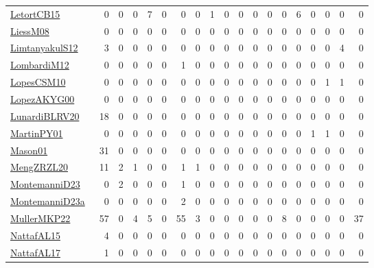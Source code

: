 {\begin{longtable}{l*{18}{r}}
\href{articles/LetortCB15.pdf}{LetortCB15}~\cite{LetortCB15} & 0 & 0 & 0 & 7 & 0 & 0 & 0 & 1 & 0 & 0 & 0 & 0 & 0 & 6 & 0 & 0 & 0 & 0\\
\href{articles/LiessM08.pdf}{LiessM08}~\cite{LiessM08} & 0 & 0 & 0 & 0 & 0 & 0 & 0 & 0 & 0 & 0 & 0 & 0 & 0 & 0 & 0 & 0 & 0 & 0\\
\href{articles/LimtanyakulS12.pdf}{LimtanyakulS12}~\cite{LimtanyakulS12} & 3 & 0 & 0 & 0 & 0 & 0 & 0 & 0 & 0 & 0 & 0 & 0 & 0 & 0 & 0 & 0 & 4 & 0\\
\href{articles/LombardiM12.pdf}{LombardiM12}~\cite{LombardiM12} & 0 & 0 & 0 & 0 & 0 & 1 & 0 & 0 & 0 & 0 & 0 & 0 & 0 & 0 & 0 & 0 & 0 & 0\\
\href{articles/LopesCSM10.pdf}{LopesCSM10}~\cite{LopesCSM10} & 0 & 0 & 0 & 0 & 0 & 0 & 0 & 0 & 0 & 0 & 0 & 0 & 0 & 0 & 0 & 1 & 1 & 0\\
\href{articles/LopezAKYG00.pdf}{LopezAKYG00}~\cite{LopezAKYG00} & 0 & 0 & 0 & 0 & 0 & 0 & 0 & 0 & 0 & 0 & 0 & 0 & 0 & 0 & 0 & 0 & 0 & 0\\
\href{articles/LunardiBLRV20.pdf}{LunardiBLRV20}~\cite{LunardiBLRV20} & 18 & 0 & 0 & 0 & 0 & 0 & 0 & 0 & 0 & 0 & 0 & 0 & 0 & 0 & 0 & 0 & 0 & 0\\
\href{articles/MartinPY01.pdf}{MartinPY01}~\cite{MartinPY01} & 0 & 0 & 0 & 0 & 0 & 0 & 0 & 0 & 0 & 0 & 0 & 0 & 0 & 0 & 1 & 1 & 0 & 0\\
\href{articles/Mason01.pdf}{Mason01}~\cite{Mason01} & 31 & 0 & 0 & 0 & 0 & 0 & 0 & 0 & 0 & 0 & 0 & 0 & 0 & 0 & 0 & 0 & 0 & 0\\
\href{articles/MengZRZL20.pdf}{MengZRZL20}~\cite{MengZRZL20} & 11 & 2 & 1 & 0 & 0 & 1 & 1 & 0 & 0 & 0 & 0 & 0 & 0 & 0 & 0 & 0 & 0 & 0\\
\href{articles/MontemanniD23.pdf}{MontemanniD23}~\cite{MontemanniD23} & 0 & 2 & 0 & 0 & 0 & 1 & 0 & 0 & 0 & 0 & 0 & 0 & 0 & 0 & 0 & 0 & 0 & 0\\
\href{articles/MontemanniD23a.pdf}{MontemanniD23a}~\cite{MontemanniD23a} & 0 & 0 & 0 & 0 & 0 & 2 & 0 & 0 & 0 & 0 & 0 & 0 & 0 & 0 & 0 & 0 & 0 & 0\\
\href{articles/MullerMKP22.pdf}{MullerMKP22}~\cite{MullerMKP22} & 57 & 0 & 4 & 5 & 0 & 55 & 3 & 0 & 0 & 0 & 0 & 0 & 8 & 0 & 0 & 0 & 0 & 37\\
\href{articles/NattafAL15.pdf}{NattafAL15}~\cite{NattafAL15} & 4 & 0 & 0 & 0 & 0 & 0 & 0 & 0 & 0 & 0 & 0 & 0 & 0 & 0 & 0 & 0 & 0 & 0\\
\href{articles/NattafAL17.pdf}{NattafAL17}~\cite{NattafAL17} & 1 & 0 & 0 & 0 & 0 & 0 & 0 & 0 & 0 & 0 & 0 & 0 & 0 & 0 & 0 & 0 & 0 & 0\\

\end{longtable}}
